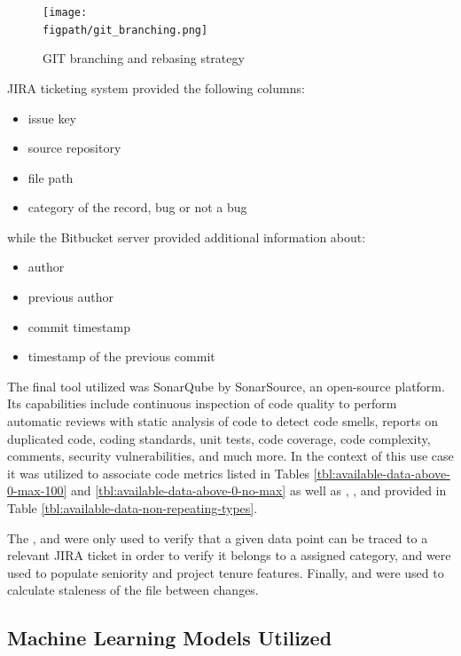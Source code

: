 \begin{figure}[!h]
    \centering
    \texttt{[image: \\figpath/git\_branching.png]}
    \caption{GIT branching and rebasing strategy}
    \label{fig:git-branching-merging-and-rebasing}
\end{figure}

JIRA ticketing system provided the following columns:
\begin{itemize}
    \item issue key
    \item source repository
    \item file path
    \item category of the record, bug or not a bug
\end{itemize}

while the Bitbucket server provided additional information about:
\begin{itemize}\label{lst:design:info-from-bitbucket}
    \item author
    \item previous author
    \item commit timestamp
    \item timestamp of the previous commit
\end{itemize}

The final tool utilized was SonarQube by SonarSource, an open-source platform. Its capabilities include continuous inspection of code quality to perform automatic reviews with static analysis of code to detect code smells, reports on duplicated code, coding standards, unit tests, code coverage, code complexity, comments,  security vulnerabilities, and much more. In the context of this use case it was utilized to associate code metrics listed in Tables \ref{tbl:available-data-above-0-max-100} and \ref{tbl:available-data-above-0-no-max} as well as \files{}, \sqaleDebt{}, \statements{} and \violations{} provided in Table \ref{tbl:available-data-non-repeating-types}.

The \issueKey{}, \sourceRepository{} and \filePath{} were only used to verify that a given data point can be traced to a relevant JIRA ticket in order to verify it belongs to a assigned category, \authorAttrib{} and \prevAuthorAttrib{} were used to populate seniority and project tenure features. Finally, \timestamp{} and \prevTimestamp{} were used to calculate staleness of the file between changes.

\subsection{Machine Learning Models Utilized}

